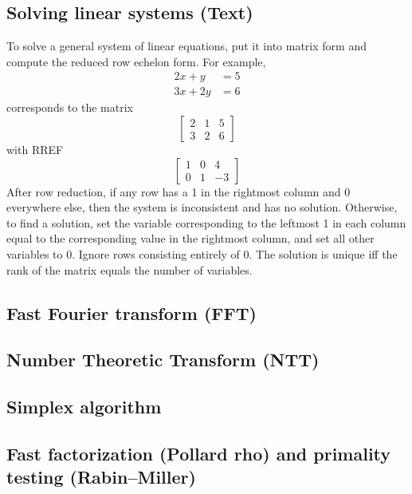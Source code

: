 \documentclass[9pt]{extarticle}
\begin{document}
\begin{multicols*}{3}
\subsection{Solving linear systems (Text)} %
To solve a general system of linear equations, put it into matrix form and
compute the reduced row echelon form. For example,
\begin{align*}2x + y &= 5 \\ 3x + 2y &= 6\end{align*}
corresponds to the matrix
\[ \left[ \begin{array}{cc|c} 2 & 1 & 5 \\ 3 & 2 & 6 \end{array} \right] \]
with RREF
\[ \left[ \begin{array}{cc|c} 1 & 0 & 4 \\ 0 & 1 & -3 \end{array} \right] \]
After row reduction, if any row has a 1 in the rightmost column and 0
everywhere else, then the system is inconsistent and has no solution.
Otherwise, to find a solution, set the variable corresponding to the leftmost 1
in each column equal to the corresponding value in the rightmost column, and
set all other variables to 0. Ignore rows consisting entirely of 0. The
solution is unique iff the rank of the matrix equals the number of variables.

\subsection{Fast Fourier transform (FFT)} %


\subsection{Number Theoretic Transform (NTT)}


\subsection{Simplex algorithm} %


\subsection{Fast factorization (Pollard rho) and primality testing
(Rabin--Miller)} %



\end{multicols*}
\end{document}
